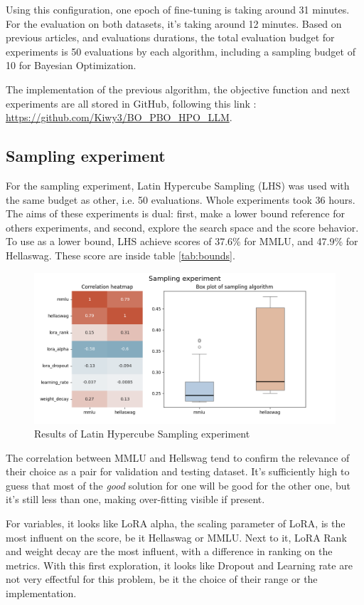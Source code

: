 \documentclass[runningheads]{llncs}
\begin{document}
Using this configuration, one epoch of fine-tuning is taking around 31 minutes. For the evaluation on both datasets, it's taking around 12 minutes. Based on previous articles, and evaluations durations, the total evaluation budget for experiments is 50 evaluations by each algorithm, including a sampling budget of 10 for Bayesian Optimization. 

The implementation of the previous algorithm, the objective function and next experiments are all stored in GitHub, following this link : \url{https://github.com/Kiwy3/BO_PBO_HPO_LLM}.

\subsection{Sampling experiment}
\label{sec:samp_exp}

For the sampling experiment, Latin Hypercube Sampling (LHS) was used with the same budget as other, i.e. 50 evaluations. Whole experiments took 36 hours. The aims of these experiments is dual: first, make a lower bound reference for others experiments, and second, explore the search space and the score behavior. To use as a lower bound, LHS achieve scores of 37.6\% for MMLU, and 47.9\% for Hellaswag. These score are inside table \ref{tab:bounds}.

\begin{figure}
    \centering
    \includegraphics[width=0.6\linewidth]{figures/sampling/lhs.png}
    \caption{Results of Latin Hypercube Sampling experiment}
    \label{fig:lhs_exp}
\end{figure}

The correlation between MMLU and Hellswag tend to confirm the relevance of their choice as a pair for validation and testing dataset. It's sufficiently high to guess that most of the \textit{good} solution for one will be good for the other one, but it's still less than one, making over-fitting visible if present.

For variables, it looks like LoRA alpha, the scaling parameter of LoRA, is the most influent on the score, be it Hellaswag or MMLU. Next to it, LoRA Rank and weight decay are the most influent, with a difference in ranking on the metrics. With this first exploration, it looks like Dropout and Learning rate are not very effectful for this problem, be it the choice of their range or the implementation. 
\end{document}
